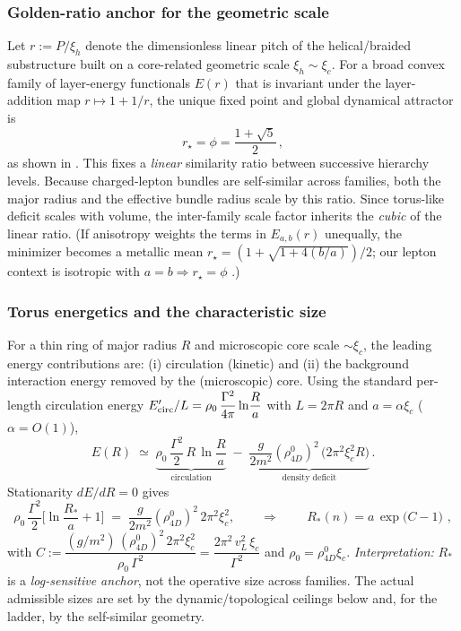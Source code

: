 \subsubsection{Golden-ratio anchor for the geometric scale}
Let \(r:=P/\xi_h\) denote the dimensionless linear pitch of the helical/braided substructure built on a core-related geometric scale \(\xi_h\sim\xi_c\). For a broad convex family of layer-energy functionals \(E(r)\) that is invariant under the layer-addition map \(r\mapsto 1+1/r\), the unique fixed point and global dynamical attractor is
\[
r_\star=\phi=\frac{1+\sqrt{5}}{2}\,,
\]
as shown in \cite{Norris2025GoldenRatio}. This fixes a \emph{linear} similarity ratio between successive hierarchy levels. Because charged-lepton bundles are self-similar across families, both the major radius and the effective bundle radius scale by this ratio. Since torus-like deficit scales with volume, the inter-family scale factor inherits the \emph{cubic} of the linear ratio. (If anisotropy weights the terms in \(E_{a,b}(r)\) unequally, the minimizer becomes a metallic mean \(r_\star=(1+\sqrt{1+4(b/a)})/2\); our lepton context is isotropic with \(a=b\Rightarrow r_\star=\phi\) \cite{Norris2025GoldenRatio}.)

\subsubsection{Torus energetics and the characteristic size}
For a thin ring of major radius \(R\) and microscopic core scale \(\sim\xi_c\), the leading energy contributions are:
(i) circulation (kinetic) and (ii) the background interaction energy removed by the (microscopic) core. Using the standard per-length circulation energy \(E'_{\rm circ}/L=\rho_0\,\dfrac{\Gamma^2}{4\pi}\ln\!\dfrac{R}{a}\) with \(L=2\pi R\) and \(a=\alpha\xi_c\) (\(\alpha=O(1)\)),
\begin{equation}
E(R)\;\simeq\;
\underbrace{\rho_0\,\frac{\Gamma^2}{2}\,R\,\ln\!\frac{R}{a}}_{\text{circulation}}
\;-\;
\underbrace{\frac{g}{2m^{2}}(\rho_{4D}^0)^2\,\big(2\pi^2\xi_c^2R\big)}_{\text{density deficit}}\,.
\label{eq:EofR}
\end{equation}
Stationarity \(dE/dR=0\) gives
\begin{equation}
\rho_0\,\frac{\Gamma^2}{2}\Big[\ln\!\frac{R_*}{a}+1\Big]\;=\;\frac{g}{2m^{2}}(\rho_{4D}^0)^2\,2\pi^2\xi_c^2,
\qquad\Rightarrow\qquad
\boxed{\,R_*(n)=a\,\exp\!\Big(C-1\Big)\,}\,,
\label{eq:Rstar}
\end{equation}
with
\(
C:=\dfrac{(g/m^{2})\,(\rho_{4D}^0)^2\,2\pi^2\xi_c^2}{\rho_0\,\Gamma^2}
=\dfrac{2\pi^2\,v_L^2\,\xi_c}{\Gamma^2}
\)
and \(\rho_0=\rho_{4D}^0\xi_c\).
\emph{Interpretation:} \(R_*\) is a \emph{log-sensitive anchor}, not the operative size across families. The actual admissible sizes are set by the dynamic/topological ceilings below and, for the ladder, by the self-similar geometry.

